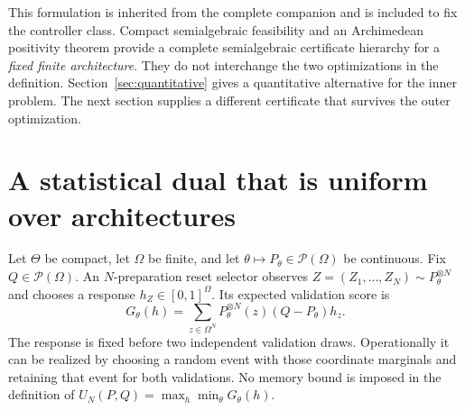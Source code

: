 \documentclass[11pt]{amsart}
\theoremstyle{definition}\newtheorem{definition}[theorem]{Definition}
\theoremstyle{remark}\newtheorem{remark}[theorem]{Remark}
\newcommand{\1}{\mathbf 1}
\newcommand{\cP}{\mathcal P}
\begin{document}
This formulation is inherited from the complete companion and is included
to fix the controller class. Compact semialgebraic feasibility and an
Archimedean positivity theorem provide a complete semialgebraic certificate
hierarchy for a \emph{fixed finite architecture}. They do not interchange
the two optimizations in the definition. Section~\ref{sec:quantitative}
gives a quantitative alternative for the inner problem. The next section
supplies a different certificate that survives the outer optimization.

\section{A statistical dual that is uniform over architectures}
\label{sec:dual}
Let $\Theta$ be compact, let $\Omega$ be finite, and let
$\theta\mapsto P_\theta\in\cP(\Omega)$ be continuous. Fix
$Q\in\cP(\Omega)$. An $N$-preparation reset selector observes
$Z=(Z_1,\ldots,Z_N)\sim P_\theta^{\otimes N}$ and chooses a response
$h_Z\in[0,1]^\Omega$. Its expected validation score is
\begin{equation}\label{eq:selector}
 G_\theta(h)=\sum_{z\in\Omega^N}P_\theta^{\otimes N}(z)
                           (Q-P_\theta)h_z.
\end{equation}
The response is fixed before two independent validation draws. Operationally
it can be realized by choosing a random event with those coordinate
marginals and retaining that event for both validations. No memory bound
is imposed in the definition of
$U_N(P,Q)=\max_h\min_\theta G_\theta(h)$.
\end{document}

